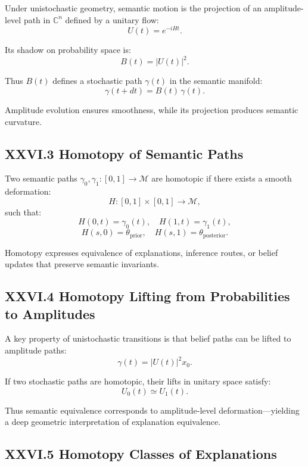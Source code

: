 \documentclass[11pt,letterpaper]{article}
\begin{document}
Under unistochastic geometry, semantic motion is the projection of an amplitude-level path in $\mathbb{C}^n$ defined by a unitary flow:
\[
U(t) = e^{-iHt}.
\]

Its shadow on probability space is:
\[
B(t) = |U(t)|^2.
\]

Thus $B(t)$ defines a stochastic path $\gamma(t)$ in the semantic manifold:
\[
\gamma(t+dt) = B(t)\, \gamma(t).
\]

Amplitude evolution ensures smoothness, while its projection produces semantic curvature.

\subsection{XXVI.3 Homotopy of Semantic Paths}

Two semantic paths $\gamma_0, \gamma_1 : [0,1]\to\mathcal{M}$ are homotopic if there exists a smooth deformation:
\[
H : [0,1]\times[0,1] \to \mathcal{M},
\]
such that:
\[
H(0,t)=\gamma_0(t), \quad H(1,t)=\gamma_1(t),
\]
\[
H(s,0)=\theta_\text{prior}, \quad H(s,1)=\theta_\text{posterior}.
\]

Homotopy expresses equivalence of explanations, inference routes, or belief updates that preserve semantic invariants.

\subsection{XXVI.4 Homotopy Lifting from Probabilities to Amplitudes}

A key property of unistochastic transitions is that belief paths can be lifted to amplitude paths:
\[
\gamma(t) = |U(t)|^2 x_0.
\]

If two stochastic paths are homotopic, their lifts in unitary space satisfy:
\[
U_0(t) \simeq U_1(t).
\]

Thus semantic equivalence corresponds to amplitude-level deformation—yielding a deep geometric interpretation of explanation equivalence.

\subsection{XXVI.5 Homotopy Classes of Explanations}
\end{document}
